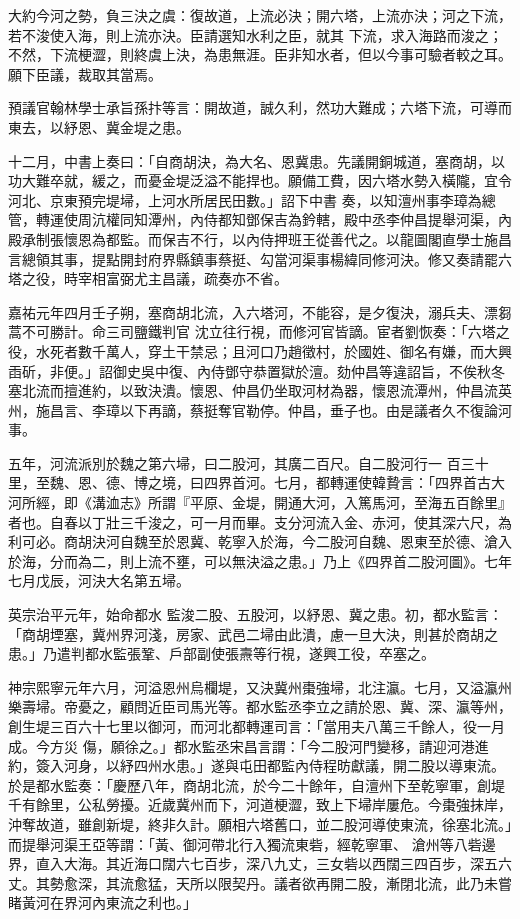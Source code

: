 \begin{pinyinscope}
 大約今河之勢，負三決之虞：復故道，上流必決；開六塔，上流亦決；河之下流，若不浚使入海，則上流亦決。臣請選知水利之臣，就其
 下流，求入海路而浚之；不然，下流梗澀，則終虞上決，為患無涯。臣非知水者，但以今事可驗者較之耳。願下臣議，裁取其當焉。



 預議官翰林學士承旨孫抃等言：開故道，誠久利，然功大難成；六塔下流，可導而東去，以紓恩、冀金堤之患。



 十二月，中書上奏曰：「自商胡決，為大名、恩冀患。先議開銅城道，塞商胡，以功大難卒就，緩之，而憂金堤泛溢不能捍也。願備工費，因六塔水勢入橫隴，宜令河北、京東預完堤埽，上河水所居民田數。」詔下中書
 奏，以知澶州事李璋為總管，轉運使周沆權同知潭州，內侍都知鄧保吉為鈐轄，殿中丞李仲昌提舉河渠，內殿承制張懷恩為都監。而保吉不行，以內侍押班王從善代之。以龍圖閣直學士施昌言總領其事，提點開封府界縣鎮事蔡挺、勾當河渠事楊緯同修河決。修又奏請罷六塔之役，時宰相富弼尤主昌議，疏奏亦不省。



 嘉祐元年四月壬子朔，塞商胡北流，入六塔河，不能容，是夕復決，溺兵夫、漂芻蒿不可勝計。命三司鹽鐵判官
 沈立往行視，而修河官皆謫。宦者劉恢奏：「六塔之役，水死者數千萬人，穿土干禁忌；且河口乃趙徵村，於國姓、御名有嫌，而大興臿斫，非便。」詔御史吳中復、內侍鄧守恭置獄於澶。劾仲昌等違詔旨，不俟秋冬塞北流而擅進約，以致決潰。懷恩、仲昌仍坐取河材為器，懷恩流潭州，仲昌流英州，施昌言、李璋以下再謫，蔡挺奪官勒停。仲昌，垂子也。由是議者久不復論河事。



 五年，河流派別於魏之第六埽，曰二股河，其廣二百尺。自二股河行一
 百三十里，至魏、恩、德、博之境，曰四界首河。七月，都轉運使韓贄言：「四界首古大河所經，即《溝洫志》所謂『平原、金堤，開通大河，入篤馬河，至海五百餘里』者也。自春以丁壯三千浚之，可一月而畢。支分河流入金、赤河，使其深六尺，為利可必。商胡決河自魏至於恩冀、乾寧入於海，今二股河自魏、恩東至於德、滄入於海，分而為二，則上流不壅，可以無決溢之患。」乃上《四界首二股河圖》。七年七月戊辰，河決大名第五埽。



 英宗治平元年，始命都水
 監浚二股、五股河，以紓恩、冀之患。初，都水監言：「商胡堙塞，冀州界河淺，房家、武邑二埽由此潰，慮一旦大決，則甚於商胡之患。」乃遣判都水監張鞏、戶部副使張燾等行視，遂興工役，卒塞之。



 神宗熙寧元年六月，河溢恩州烏欄堤，又決冀州棗強埽，北注瀛。七月，又溢瀛州樂壽埽。帝憂之，顧問近臣司馬光等。都水監丞李立之請於恩、冀、深、瀛等州，創生堤三百六十七里以御河，而河北都轉運司言：「當用夫八萬三千餘人，役一月成。今方災
 傷，願徐之。」都水監丞宋昌言謂：「今二股河門變移，請迎河港進約，簽入河身，以紓四州水患。」遂與屯田都監內侍程昉獻議，開二股以導東流。於是都水監奏：「慶歷八年，商胡北流，於今二十餘年，自澶州下至乾寧軍，創堤千有餘里，公私勞擾。近歲冀州而下，河道梗澀，致上下埽岸屢危。今棗強抹岸，沖奪故道，雖創新堤，終非久計。願相六塔舊口，並二股河導使東流，徐塞北流。」而提舉河渠王亞等謂：「黃、御河帶北行入獨流東砦，經乾寧軍、
 滄州等八砦邊界，直入大海。其近海口闊六七百步，深八九丈，三女砦以西闊三四百步，深五六丈。其勢愈深，其流愈猛，天所以限契丹。議者欲再開二股，漸閉北流，此乃未嘗睹黃河在界河內東流之利也。」




\end{pinyinscope}
